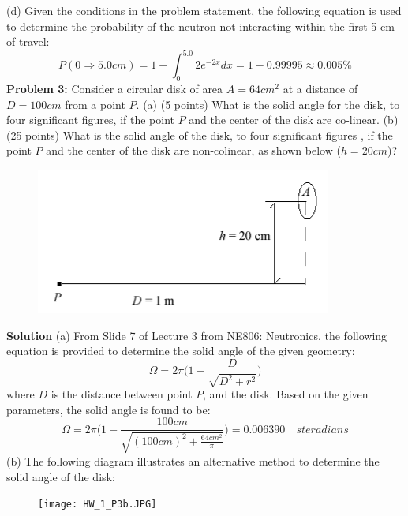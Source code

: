 \documentclass{amsart}
\theoremstyle{definition}
\begin{document}
(d) Given the conditions in the problem statement, the following equation is used to determine the probability of the neutron not interacting within the first 5 cm of travel:
\bigbreak
\begin{equation*}
    P(0\Rightarrow5.0cm) = 1 - \int_{0}^{5.0}2e^{-2x}dx = 1 - 0.99995 \approx \boxed{0.005\%}
\end{equation*}
\newpage
\textbf{Problem 3:} Consider a circular disk of area $A=64 cm^2$ at a distance of $D=100 cm$ from a point $P$. \newline
(a) (5 points) What is the solid angle for the disk, to four significant figures, if the point $P$ and the center of the disk are co-linear. \newline
(b) (25 points) What is the solid angle of the disk, to four significant figures , if the point $P$ and the center of the disk are non-colinear, as shown below ($h=20 cm$)? \newline
\begin{figure}[h!]
                \includegraphics[width=0.6\linewidth]{HW1_Problem3.png}
\end{figure}
\bigbreak
\textbf{Solution}
\bigbreak
(a) From Slide 7 of Lecture 3 from NE806: Neutronics, the following equation is provided to determine the solid angle of the given geometry:
\bigbreak
\begin{equation*}
   \Omega  = 2\pi\bigg(1-\frac{D}{\sqrt{D^2+r^2}}\bigg)
\end{equation*}
\bigbreak
where $D$ is the distance between point $P$, and the disk. Based on the given parameters, the solid angle is found to be:
\bigbreak
\begin{equation*}
   \Omega  = 2\pi\bigg(1-\frac{100 cm}{\sqrt{(100 cm)^2+\frac{64cm^2}{\pi}}}\bigg) = \boxed{0.006390 \quad steradians}
\end{equation*}
\bigbreak
(b) The following diagram illustrates an alternative method to determine the solid angle of the disk:
\begin{figure}[h!]
                \texttt{[image: HW\_1\_P3b.JPG]}
\end{figure}
\end{document}
